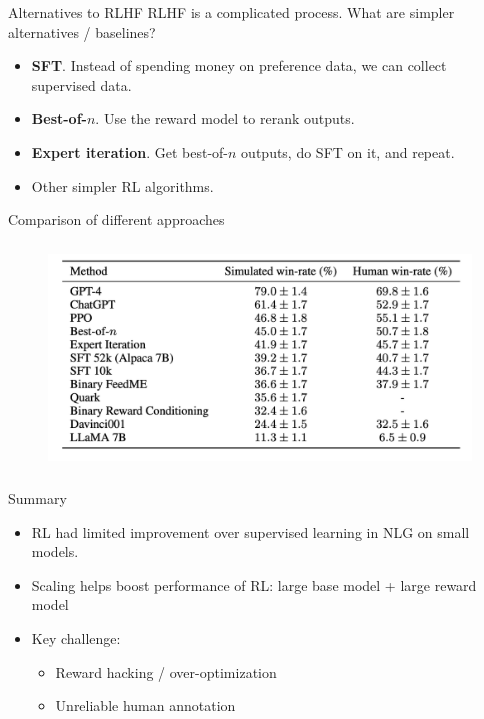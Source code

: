 \documentclass[usenames,dvipsnames,notes,11pt,aspectratio=169,hyperref={colorlinks=true, linkcolor=blue}]{beamer}
\begin{document}
\begin{frame}
    {Alternatives to RLHF}
    RLHF is a complicated process. What are simpler alternatives / baselines?\pause

    \begin{itemize}
        \itemsep1em
        \item {\bf SFT}. Instead of spending money on preference data, we can collect supervised data. 
        \item {\bf Best-of-$n$}. Use the reward model to rerank outputs.
        \item {\bf Expert iteration}. Get best-of-$n$ outputs, do SFT on it, and repeat.
        \item Other simpler RL algorithms.
    \end{itemize}
\end{frame}

\begin{frame}
    {Comparison of different approaches}
    
    \vspace{-1.5em}
        \begin{figure}
            \includegraphics[height=6cm]{figures/alpaca-farm}
        \end{figure}
    \vspace{-1.5em}
\end{frame}

\begin{frame}
    {Summary}
    \begin{itemize}
        \itemsep1em
        \item RL had limited improvement over supervised learning in NLG on small models.
        \item Scaling helps boost performance of RL: large base model + large reward model 
        \item Key challenge:
            \begin{itemize}
                \item Reward hacking / over-optimization
                \item Unreliable human annotation
            \end{itemize}
    \end{itemize}
\end{frame}
\end{document}
